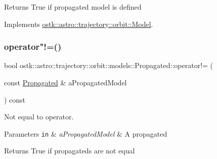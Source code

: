 \begin{DoxyReturn}{Returns}
True if propagated model is defined 
\end{DoxyReturn}


Implements \hyperlink{classostk_1_1astro_1_1trajectory_1_1orbit_1_1_model_a13c5b5693dd86a072da0bd0e319bacc2}{ostk\+::astro\+::trajectory\+::orbit\+::\+Model}.

\mbox{\label{classostk_1_1astro_1_1trajectory_1_1orbit_1_1models_1_1_propagated_a71c17288a6039ddcc1a5d3e5e62e1f35}} 
\subsubsection{\texorpdfstring{operator"!=()}{operator!=()}\hspace{0.1cm}{\footnotesize\ttfamily [1/2]}}
{\footnotesize\ttfamily bool ostk\+::astro\+::trajectory\+::orbit\+::models\+::\+Propagated\+::operator!= (\begin{DoxyParamCaption}\item[{const \hyperlink{classostk_1_1astro_1_1trajectory_1_1orbit_1_1models_1_1_propagated}{Propagated} \&}]{a\+Propagated\+Model }\end{DoxyParamCaption}) const}



Not equal to operator. 


\begin{DoxyParams}[1]{Parameters}
\mbox{\tt in}  & {\em a\+Propagated\+Model} & A propagated \\
\hline
\end{DoxyParams}
\begin{DoxyReturn}{Returns}
True if propagateds are not equal 
\end{DoxyReturn}
\mbox{\label{classostk_1_1astro_1_1trajectory_1_1orbit_1_1models_1_1_propagated_aeffaddcde5540fd1226add8466415d08}} 
